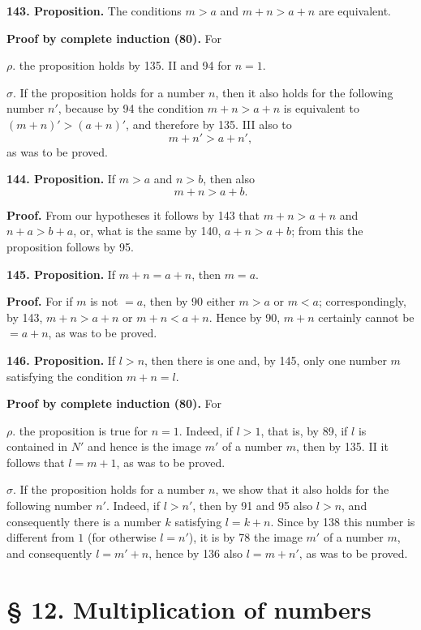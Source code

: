 \documentclass[11pt]{article}
\begin{document}
\noindent\textbf{143. Proposition.} The conditions $m>a$ and $m+n>a+n$ are equivalent.

\noindent\textbf{Proof by complete induction (80).} For

\noindent $\rho.$ the proposition holds by 135. II and 94 for $n=1$.

\noindent $\sigma.$ If the proposition holds for a number $n$, then it also holds for the following number $n'$, because by 94 the condition $m+n>a+n$ is equivalent to $(m+n)'>(a+n)'$, and therefore by 135. III also to
\[
m+n'>a+n',
\]
as was to be proved.

\noindent\textbf{144. Proposition.} If $m>a$ and $n>b$, then also
\[
m+n>a+b.
\]

\noindent\textbf{Proof.} From our hypotheses it follows by 143 that $m+n>a+n$ and $n+a>b+a$, or, what is the same by 140, $a+n>a+b$; from this the proposition follows by 95.

\noindent\textbf{145. Proposition.} If $m+n=a+n$, then $m=a$.

\noindent\textbf{Proof.} For if $m$ is not $=a$, then by 90 either $m>a$ or $m<a$; correspondingly, by 143, $m+n>a+n$ or $m+n<a+n$. Hence by 90, $m+n$ certainly cannot be $=a+n$, as was to be proved.

\noindent\textbf{146. Proposition.} If $l>n$, then there is one and, by 145, only one number $m$ satisfying the condition $m+n=l$.

\noindent\textbf{Proof by complete induction (80).} For

\noindent $\rho.$ the proposition is true for $n=1$. Indeed, if $l>1$, that is, by 89, if $l$ is contained in $N'$ and hence is the image $m'$ of a number $m$, then by 135. II it follows that $l=m+1$, as was to be proved.

\noindent $\sigma.$ If the proposition holds for a number $n$, we show that it also holds for the following number $n'$. Indeed, if $l>n'$, then by 91 and 95 also $l>n$, and consequently there is a number $k$ satisfying $l=k+n$. Since by 138 this number is different from $1$ (for otherwise $l=n'$), it is by 78 the image $m'$ of a number $m$, and consequently $l=m'+n$, hence by 136 also $l=m+n'$, as was to be proved.

\section*{§ 12. Multiplication of numbers}
\end{document}
